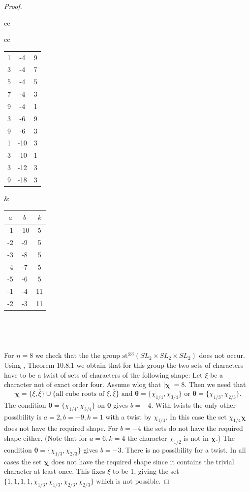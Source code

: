 \documentclass[12pt]{amsart}
\theoremstyle{plain}
\theoremstyle{definition}
\theoremstyle{remark}
\numberwithin{equation}{section}
\begin{document}
\begin{proof}
\begin{center}
\begin{minipage}{0.75\textwidth}
\begin{tabular}{cc}
\begin{tabular}{cc}
\begin{tabular}{c|c|c}
    \hline
         1 & -4 & 9 \\ 
        3 & -4 & 7 \\
        5 & -4 & 5 \\
        7 & -4 & 3 \\
        9 & -4 & 1 \\
        3 & -6 & 9 \\
        9 & -6 & 3 \\
        1 & -10 & 3 \\
        3 & -10 & 1 \\
        3 & -12 & 3 \\
        9 & -18 & 3\vspace{37pt}\\
    \end{tabular}&
     \begin{tabular}{c|c|c}    
    $a$&$b$&$k$ \\
    \hline
       -1 & -10 & 5 \\
        -2 & -9 & 5 \\
        -3 & -8 & 5 \\
        -4 & -7 & 5 \\
        -5 & -6 & 5 \\
        -1 & -4 & 11 \\
        -2 & -3 & 11\vspace{93pt} \\
  \end{tabular} \\
     \end{tabular} \\
\end{tabular}    
\end{minipage}
\end{center}


    For $n=8$ we check that the the group $\mathrm{st}^{\otimes 3}(SL_2\times SL_2\times SL_2)$ does not occur. Using \cite{Katzbook}, Theorem 10.8.1 we obtain that for this group the two sets of characters have to be a twist of sets of characters of the following shape: 
Let $\xi$ be a character not of exact order four.
Assume wlog that $|\bm\chi|=8$. Then we need that 
$$\bm{\chi}=\{\xi,\bar\xi\}\cup \{\text{all cube roots of }\xi,\bar\xi\}\text{ and } \bm\theta=\{\chi_{1/4},\chi_{3/4}\} \text { or }\bm\theta=\{\chi_{1/3},\chi_{2/3}\}.$$
The condition $\bm\theta=\{\chi_{1/4},\chi_{3/4}\}$ on $\bm \theta$ gives $b=-4$. 
With twists the only other possibility is $a=2,b=-9,k=1$ with a twist by $\chi_{1/4}$. In this case the set $\chi_{1/4}\bm\chi$ does not have the required shape. 
For $b=-4$ the sets do not have the required shape either. (Note that for $a=6, k=4$ the character $\chi_{1/2}$ is not in $\bm{\chi}$.)
The condition $\bm\theta=\{\chi_{1/3},\chi_{2/3}\}$ gives $b=-3$. There is no possibility for a twist. In all cases the set $\bm\chi$ does not have the required shape since it contains the trivial character at least once. This fixes $\xi$ to be 1, giving the set $\{1,1,1,1,\chi_{1/3},\chi_{1/3},\chi_{2/3},\chi_{2/3}\}$  which is not possible.




\end{proof}
\end{document}
